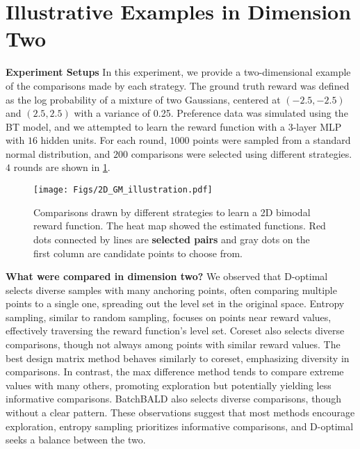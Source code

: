 \section{Illustrative Examples in Dimension Two}
\label{app:2Dilustration}
\textbf{Experiment Setups}
In this experiment, we provide a two-dimensional example of the comparisons made by each strategy. The ground truth reward was defined as the log probability of a mixture of two Gaussians, centered at $(-2.5, -2.5)$ and $(2.5, 2.5)$ with a variance of 0.25. Preference data was simulated using the BT model, and we attempted to learn the reward function with a 3-layer MLP with $16$ hidden units. For each round, $1000$ points were sampled from a standard normal distribution, and $200$ comparisons were selected using different strategies. $4$ rounds are shown in \cref{fig:what_were_compared}.%
\begin{figure}[htp]
    \centering
    \texttt{[image: Figs/2D\_GM\_illustration.pdf]}\vspace{-0.35cm}
    \caption{\small Comparisons drawn by different strategies to learn a 2D bimodal reward function. The heat map showed the estimated functions. Red dots connected by lines are \textbf{selected pairs} and gray dots on the first column are candidate points to choose from.} %
    \label{fig:what_were_compared}
\end{figure}

\textbf{What were compared in dimension two?}
We observed that D-optimal selects diverse samples with many anchoring points, often comparing multiple points to a single one, spreading out the level set in the original space. Entropy sampling, similar to random sampling, focuses on points near reward values, effectively traversing the reward function's level set. Coreset also selects diverse comparisons, though not always among points with similar reward values. The best design matrix method behaves similarly to coreset, emphasizing diversity in comparisons. In contrast, the max difference method tends to compare extreme values with many others, promoting exploration but potentially yielding less informative comparisons. BatchBALD also selects diverse comparisons, though without a clear pattern. These observations suggest that most methods encourage exploration, entropy sampling prioritizes informative comparisons, and D-optimal seeks a balance between the two.